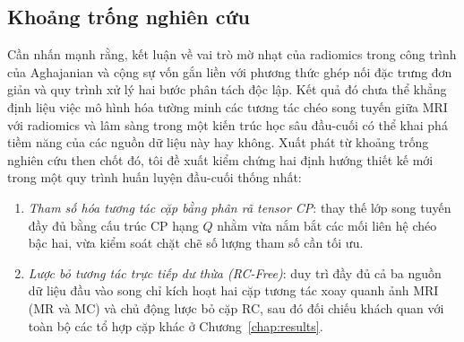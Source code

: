 \subsection{Khoảng trống nghiên cứu}
\label{sec:research-gaps}
Cần nhấn mạnh rằng, kết luận về vai trò mờ nhạt của radiomics trong công trình của Aghajanian và cộng sự vốn gắn liền với phương thức ghép nối đặc trưng đơn giản và quy trình xử lý hai bước phân tách độc lập. Kết quả đó chưa thể khẳng định liệu việc mô hình hóa tường minh các tương tác chéo song tuyến giữa MRI với radiomics và lâm sàng trong một kiến trúc học sâu đầu-cuối có thể khai phá tiềm năng của các nguồn dữ liệu này hay không. Xuất phát từ khoảng trống nghiên cứu then chốt đó, tôi đề xuất kiểm chứng hai định hướng thiết kế mới trong một quy trình huấn luyện đầu-cuối thống nhất:
\begin{enumerate}[itemsep=0.1em,topsep=0.2em]
\item \emph{Tham số hóa tương tác cặp bằng phân rã tensor CP}: thay thế lớp song tuyến đầy đủ bằng cấu trúc CP hạng $Q$ nhằm vừa nắm bắt các mối liên hệ chéo bậc hai, vừa kiểm soát chặt chẽ số lượng tham số cần tối ưu.
\item \emph{Lược bỏ tương tác trực tiếp dư thừa (RC-Free)}: duy trì đầy đủ cả ba nguồn dữ liệu đầu vào song chỉ kích hoạt hai cặp tương tác xoay quanh ảnh MRI (MR và MC) và chủ động lược bỏ cặp RC, sau đó đối chiếu khách quan với toàn bộ các tổ hợp cặp khác ở Chương~\ref{chap:results}.
\end{enumerate}
